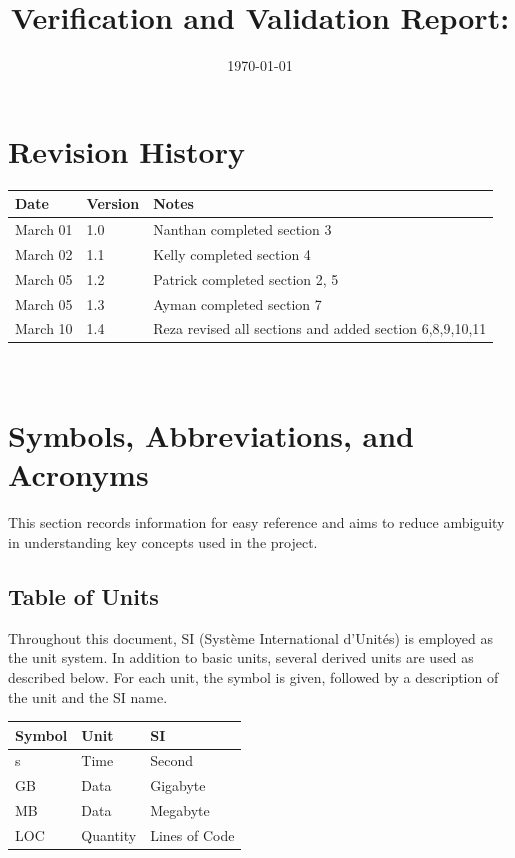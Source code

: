 \documentclass[12pt, titlepage]{article}
\begin{document}
\title{Verification and Validation Report: \progname} 
\author{\authname}
\date{\today}
	
\maketitle


\section{Revision History}

\begin{tabularx}{\textwidth}{p{3cm}p{2cm}X}
\toprule {\bf Date} & {\bf Version} & {\bf Notes}\\
\midrule
March 01 & 1.0 & Nanthan completed section 3\\
March 02 & 1.1 & Kelly completed section 4\\
March 05 & 1.2 & Patrick completed section 2, 5\\
March 05 & 1.3 & Ayman completed section 7\\
March 10 & 1.4 & Reza revised all sections and added section 6,8,9,10,11\\
\bottomrule
\end{tabularx}

~\newpage

\section{Symbols, Abbreviations, and Acronyms}
This section records information for easy reference and aims to reduce ambiguity in understanding key concepts used in the project.

\subsection{Table of Units}

Throughout this document, SI (Système International d'Unités) is employed as the unit system. In addition to basic units, several derived units are used as described below. For each unit, the symbol is given, followed by a description of the unit and the SI name.

\renewcommand{\arraystretch}{1.2}
\noindent \begin{tabular}{l l l} 
    \toprule		
    \textbf{Symbol} & \textbf{Unit} & \textbf{SI}\\
    \midrule 
    \si{s} & Time & Second\\
    \si{GB} & Data & Gigabyte\\
    \si{MB} & Data & Megabyte\\
    \si{LOC} & Quantity & Lines of Code\\
    \bottomrule
\end{tabular}
\end{document}
